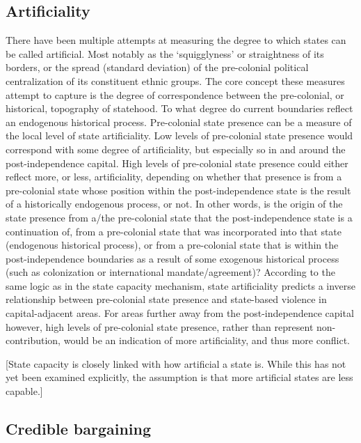 \documentclass[12pt]{article}
\begin{document}
\subsection{Artificiality} \label{Artificiality}

There have been multiple attempts at measuring the degree to which states can be
called artificial. Most notably as the `squigglyness' or straightness of its
borders, or the spread (standard deviation) of the pre-colonial political
centralization of its constituent ethnic groups. The core concept these measures
attempt to capture is the degree of correspondence between the pre-colonial, or
historical, topography of statehood. To what degree do current boundaries
reflect an endogenous historical process. Pre-colonial state presence can be a
measure of the local level of state artificiality. Low levels of pre-colonial
state presence would correspond with some degree of artificiality, but
especially so in and around the post-independence capital. High levels of
pre-colonial state presence could either reflect more, or less, artificiality,
depending on whether that presence is from a pre-colonial state whose position
within the post-independence state is the result of a historically endogenous
process, or not. In other words, is the origin of the state presence from a/the
pre-colonial state that the post-independence state is a continuation of, from a
pre-colonial state that was incorporated into that state (endogenous historical
process), or from a pre-colonial state that is within the post-independence
boundaries as a result of some exogenous historical process (such as
colonization or international mandate/agreement)? According to the same logic as
in the state capacity mechanism, state artificiality predicts a inverse
relationship between pre-colonial state presence and state-based violence in
capital-adjacent areas. For areas further away from the post-independence
capital however, high levels of pre-colonial state presence, rather than
represent non-contribution, would be an indication of more artificiality, and
thus more conflict.

[State capacity is closely linked with how artificial a state is. While this has
not yet been examined explicitly, the assumption is that more artificial states
are less capable.]

\subsection{Credible bargaining} \label{Credible bargaining}
\end{document}
